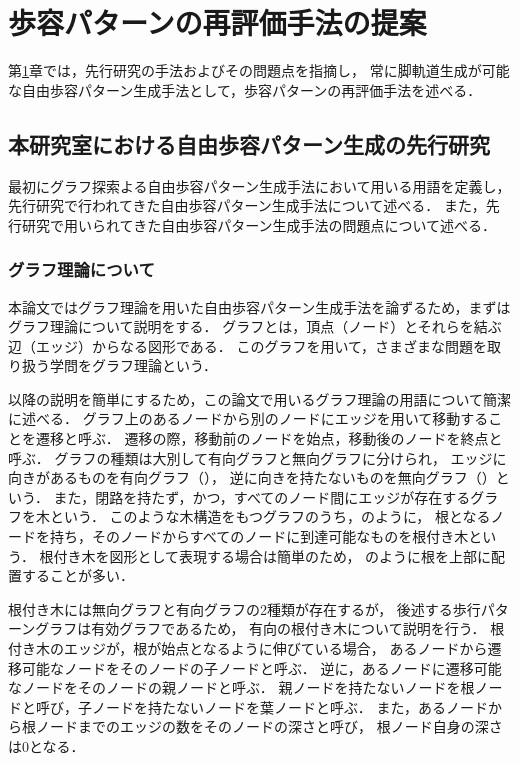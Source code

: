 ﻿%


\chapter{歩容パターンの再評価手法の提案}\label{chapter:歩容パターンの再評価手法の提案}
第\ref{chapter:歩容パターンの再評価手法の提案}章では，先行研究の手法およびその問題点を指摘し，
常に脚軌道生成が可能な自由歩容パターン生成手法として，歩容パターンの再評価手法を述べる．

\section{本研究室における自由歩容パターン生成の先行研究}
最初にグラフ探索よる自由歩容パターン生成手法において用いる用語を定義し，
先行研究で行われてきた自由歩容パターン生成手法について述べる．
また，先行研究で用いられてきた自由歩容パターン生成手法の問題点について述べる．

\subsection{グラフ理論について}
本論文ではグラフ理論を用いた自由歩容パターン生成手法を論ずるため，まずはグラフ理論について説明をする．
グラフとは，頂点（ノード）とそれらを結ぶ辺（エッジ）からなる図形である．
このグラフを用いて，さまざまな問題を取り扱う学問をグラフ理論という．

以降の説明を簡単にするため，この論文で用いるグラフ理論の用語について簡潔に述べる．
グラフ上のあるノードから別のノードにエッジを用いて移動することを遷移と呼ぶ．
遷移の際，移動前のノードを始点，移動後のノードを終点と呼ぶ．
グラフの種類は大別して有向グラフと無向グラフに分けられ，
エッジに向きがあるものを有向グラフ（），
逆に向きを持たないものを無向グラフ（）という．
また，閉路を持たず，かつ，すべてのノード間にエッジが存在するグラフを木という．
このような木構造をもつグラフのうち，のように，
根となるノードを持ち，そのノードからすべてのノードに到達可能なものを根付き木という．
根付き木を図形として表現する場合は簡単のため，
のように根を上部に配置することが多い．

根付き木には無向グラフと有向グラフの2種類が存在するが，
後述する歩行パターングラフは有効グラフであるため，
有向の根付き木について説明を行う．
根付き木のエッジが，根が始点となるように伸びている場合，
あるノードから遷移可能なノードをそのノードの子ノードと呼ぶ．
逆に，あるノードに遷移可能なノードをそのノードの親ノードと呼ぶ．
親ノードを持たないノードを根ノードと呼び，子ノードを持たないノードを葉ノードと呼ぶ．
また，あるノードから根ノードまでのエッジの数をそのノードの深さと呼び，
根ノード自身の深さは0となる．

